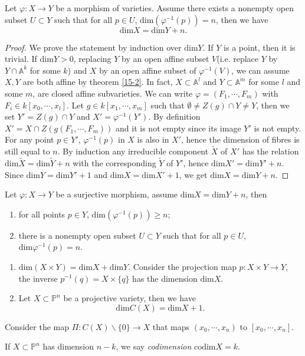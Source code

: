 \begin{proposition}
	Let $ \varphi:X\to Y $ be a morphism of varieties. Assume there exists a nonempty open subset $ U\subset Y $ such that for all $ p\in U $, $ \mathrm{dim}(\varphi^{-1}(p))=n $, then we have
	$$
		\mathrm{dim}X=\mathrm{dim}Y+n.
	$$
\end{proposition}
\begin{proof}
	We prove the statement by induction over $ \mathrm{dim}Y $. If $ Y $ is a point, then it is trivial. If $ \mathrm{dim}Y>0 $, replacing $ Y $ by an open affine subset $ V $(i.e. replace $ Y $ by $ Y\cap \mathbb{A}^k $ for some $ k $) and $ X $ by an open affine subset of $ \varphi^{-1}(V) $, we can assume $ X,Y $ are both affine by theorem \ref{15-2}. In fact, $ X\subset \mathbb{A}^l $ and $ Y\subset \mathbb{A}^m $ for some $ l $ and some $ m $, are closed affine subvarieties. We can write $ \varphi=(F_1,\cdots,F_m) $ with $ F_i\in k[x_0,\cdots,x_l] $. Let $ g\in k[x_1,\cdots,x_m] $ such that $ \emptyset \neq Z(g)\cap Y\neq Y $, then we set $ Y'=Z(g)\cap Y $ and $ X'=\varphi^{-1}(Y') $. By definition $ X'=X\cap Z(g(F_1,\cdots,F_m)) $ and it is not empty since its image $ Y' $ is not empty. For any point $ p\in Y' $, $ \varphi^{-1}(p) $ in $ X $ is also in $ X' $, hence the dimension of fibres is still equal to $ n $.  By induction any irreducible component $ \tilde{X} $ of $ X' $ has the relation $ \mathrm{dim}\tilde{X}=\mathrm{dim}\tilde{Y}+n $ with the corresponding $ \tilde{Y} $ of $ Y' $, hence $ \mathrm{dim}X'=\mathrm{dim}Y'+n $. Since $ \mathrm{dim}Y=\mathrm{dim}Y'+1 $ and $ \mathrm{dim}X=\mathrm{dim}X'+1 $, we get $ \mathrm{dim}X=\mathrm{dim}Y+n $.
\end{proof}
\begin{theorem}
	Let $ \varphi:X\to Y $ be a surjective morphism, assume $ \mathrm{dim}X=\mathrm{dim}Y+n $, then
	\begin{enumerate}
		\item for all points $ p\in Y $, $ \mathrm{dim}(\varphi^{-1}(p))\geq n $;
		\item there is a nonempty open subset $ U\subset Y $ such that for all $ p\in U $, $ \mathrm{dim}\varphi^{-1}(p)=n $.
	\end{enumerate}
\end{theorem}
\begin{example}{}
  \noindent
	\begin{enumerate}
		\item $ \mathrm{dim}(X\times Y)=\mathrm{dim}X+\mathrm{dim}Y $. Consider the projection map $ p:X\times Y\to Y $, the inverse $ p^{-1}(q)=X\times \lbrace q \rbrace $ has the dimension $ \mathrm{dim}X $.
		\item Let $ X\subset \mathbb{P}^n $ be a projective variety, then we have
		      $$
			      \mathrm{dim}C(X)=\mathrm{dim}X+1.
		      $$
	\end{enumerate}
	Consider the map $ \Pi:C(X)\backslash \lbrace 0 \rbrace\to X $ that maps $ (x_0,\cdots,x_n) $ to $ [x_0,\cdots,x_n] $.
\end{example}
\begin{definition}
	If $ X\subset \mathbb{P}^n $ has dimension $ n-k $, we say \textit{codimension} $ \text{codim}X=k $.
\end{definition}

